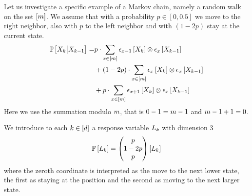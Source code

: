 \begin{example}\label{exa:rwResponse}

    Let us investigate a specific example of a Markov chain, namely a random walk on the set $[m]$.
    We assume that with a probability $p\in[0,0.5]$ we move to the right neighbor, also with $p$ to the left neighbor and with $(1-2p)$ stay at the current state.
    \begin{align*}
        \mathbb{P}\big[X_{k}\big|X_{k-1}\big]
        =& p \cdot \sum_{x\in[m]} \epsilon_{x-1}\left[X_{k}\right] \otimes \epsilon_{x}\left[X_{k-1}\right] \\
        &+ (1-2p) \cdot \sum_{x\in[m]} \epsilon_{x}\left[X_{k}\right] \otimes \epsilon_{x}\left[X_{k-1}\right] \\
        &+ p \cdot \sum_{x\in[m]} \epsilon_{x+1}\left[X_{k}\right] \otimes \epsilon_{x}\left[X_{k-1}\right]
    \end{align*}
    Here we use the summation modulo $m$, that is $0-1=m-1$ and $m-1+1=0$.

    We introduce to each $k\in[d]$ a response variable $L_{k}$ with dimension $3$
    \begin{align*}
        \mathbb{P}\left[L_{k}\right]
        = \begin{pmatrix} p \\ 1-2p \\ p \end{pmatrix}\left[L_{k}\right]
    \end{align*}
    where the zeroth coordinate is interpreted as the move to the next lower state, the first as staying at the position and the second as moving to the next larger state.


\end{example}
